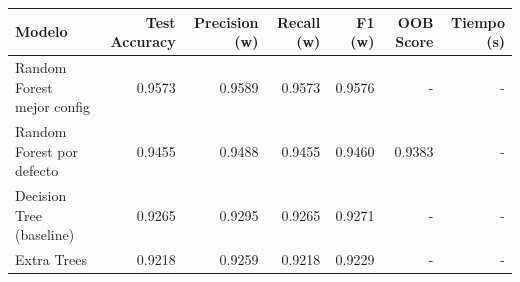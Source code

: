 \begin{tabular}{lrrrrrr}
\toprule
Modelo & Test Accuracy & Precision (w) & Recall (w) & F1 (w) & OOB Score & Tiempo (s) \\
\midrule
Random Forest mejor config & 0.9573 & 0.9589 & 0.9573 & 0.9576 & - & - \\
Random Forest por defecto & 0.9455 & 0.9488 & 0.9455 & 0.9460 & 0.9383 & - \\
Decision Tree (baseline) & 0.9265 & 0.9295 & 0.9265 & 0.9271 & - & - \\
Extra Trees & 0.9218 & 0.9259 & 0.9218 & 0.9229 & - & - \\
\bottomrule
\end{tabular}
